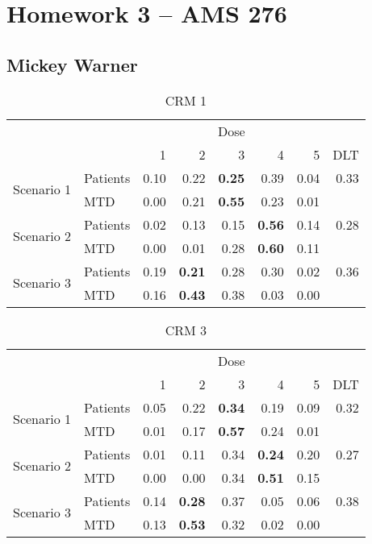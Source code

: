 \documentclass[12pt]{article}
\begin{document}
\section*{Homework 3 -- AMS 276}
\subsection*{Mickey Warner}
\bigskip
\bigskip


\begin{table}[ht]
\begin{center}
\begin{tabular}{llrrrrrr}
\hline\hline
& & \multicolumn{5}{c}{Dose} & \\
& & 1 & 2 & 3 & 4 & 5 & DLT \\  \hline
\multirow{2}{*}{Scenario 1} & Patients    & 0.10 & 0.22 & \textbf{0.25} & 0.39 & 0.04 & 0.33 \\
                            & MTD         & 0.00 & 0.21 & \textbf{0.55} & 0.23 & 0.01 &      \\
\multirow{2}{*}{Scenario 2} & Patients    & 0.02 & 0.13 & 0.15 & \textbf{0.56} & 0.14 & 0.28 \\
                            & MTD         & 0.00 & 0.01 & 0.28 & \textbf{0.60} & 0.11 &      \\
\multirow{2}{*}{Scenario 3} & Patients    & 0.19 & \textbf{0.21} & 0.28 & 0.30 & 0.02 & 0.36 \\
                            & MTD         & 0.16 & \textbf{0.43} & 0.38 & 0.03 & 0.00 &      \\
\hline\hline
\end{tabular}
\caption{CRM 1}
\end{center}
\end{table}

\begin{table}[ht]
\begin{center}
\begin{tabular}{llrrrrrr}
\hline\hline
& & \multicolumn{5}{c}{Dose} & \\
& & 1 & 2 & 3 & 4 & 5 & DLT \\  \hline
\multirow{2}{*}{Scenario 1} & Patients    & 0.05 & 0.22 & \textbf{0.34} & 0.19 & 0.09 & 0.32 \\
                            & MTD         & 0.01 & 0.17 & \textbf{0.57} & 0.24 & 0.01 &      \\
\multirow{2}{*}{Scenario 2} & Patients    & 0.01 & 0.11 & 0.34 & \textbf{0.24} & 0.20 & 0.27 \\
                            & MTD         & 0.00 & 0.00 & 0.34 & \textbf{0.51} & 0.15 &      \\
\multirow{2}{*}{Scenario 3} & Patients    & 0.14 & \textbf{0.28} & 0.37 & 0.05 & 0.06 & 0.38 \\
                            & MTD         & 0.13 & \textbf{0.53} & 0.32 & 0.02 & 0.00 &      \\
\hline\hline
\end{tabular}
\caption{CRM 3}
\end{center}
\end{table}
\end{document}
